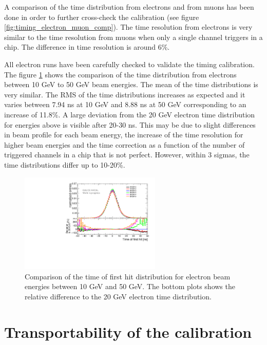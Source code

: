 A comparison of the time distribution from electrons and from muons has been done in order to further cross-check the calibration (see figure \ref{fig:timing_electron_muon_comp}). The time resolution from electrons is very similar to the time resolution from muons when only a single channel triggers in a chip. The difference in time resolution is around 6\%.

All electron runs have been carefully checked to validate the timing calibration. The figure \ref{fig:all_electron_energies} shows the comparison of the time distribution from electrons between 10 GeV to 50 GeV beam energies. The mean of the time distributions is very similar. The RMS of the time distributions increases as expected and it varies between 7.94 ns at 10 GeV and 8.88 ns at 50 GeV corresponding to an increase of 11.8\%. A large deviation from the 20 GeV electron time distribution for energies above is visible after 20-30 ns. This may be due to slight differences in beam profile for each beam energy, the increase of the time resolution for higher beam energies and the time correction as a function of the number of triggered channels in a chip that is not perfect. However, within 3 sigmas, the time distributions differ up to 10-20\%.

\begin{figure}[htbp!]
	\centering
	\includegraphics[width=0.6\textwidth]{../Thesis_Plots/Timing/Electrons/Plots/ComparisonDataEnergies.pdf}
	\caption{Comparison of the time of first hit distribution for electron beam energies between 10 GeV and 50 GeV. The bottom plots shows the relative difference to the 20 GeV electron time distribution.}
	\label{fig:all_electron_energies}
\end{figure}

\section{Transportability of the calibration}

